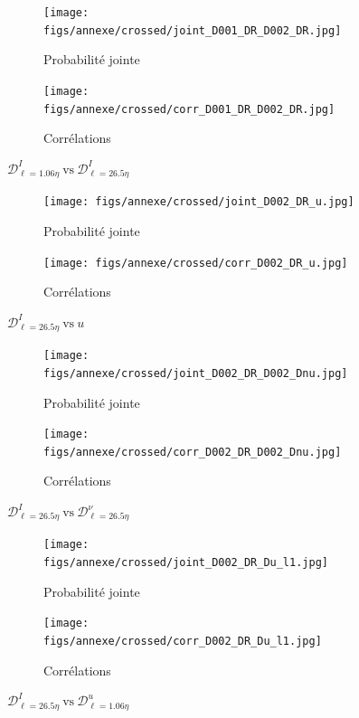 \documentclass[13pt, a4paper]{extarticle}
\begin{document}
\begin{figure}[H]
  \centering
  \begin{subfigure}[b]{0.48\linewidth}
  \centering
  \texttt{[image: figs/annexe/crossed/joint\_D001\_DR\_D002\_DR.jpg]}
  \caption{Probabilité jointe}
  \end{subfigure}
  \begin{subfigure}[b]{0.48\linewidth}
    \centering
    \texttt{[image: figs/annexe/crossed/corr\_D001\_DR\_D002\_DR.jpg]}
    \caption{Corrélations}
    \end{subfigure}
    \caption{$\mathscr{D}^I_{\ell=1.06\eta}~\text{vs}~\mathscr{D}^I_{\ell=26.5\eta}$}
\end{figure}

\begin{figure}[H]
  \centering
  \begin{subfigure}[b]{0.48\linewidth}
  \centering
  \texttt{[image: figs/annexe/crossed/joint\_D002\_DR\_u.jpg]}
  \caption{Probabilité jointe}
  \end{subfigure}
  \begin{subfigure}[b]{0.48\linewidth}
    \centering
    \texttt{[image: figs/annexe/crossed/corr\_D002\_DR\_u.jpg]}
    \caption{Corrélations}
    \end{subfigure}
    \caption{$\mathscr{D}^I_{\ell=26.5\eta}~\text{vs}~u$}
\end{figure}

\begin{figure}[H]
  \centering
  \begin{subfigure}[b]{0.48\linewidth}
  \centering
  \texttt{[image: figs/annexe/crossed/joint\_D002\_DR\_D002\_Dnu.jpg]}
  \caption{Probabilité jointe}
  \end{subfigure}
  \begin{subfigure}[b]{0.48\linewidth}
    \centering
    \texttt{[image: figs/annexe/crossed/corr\_D002\_DR\_D002\_Dnu.jpg]}
    \caption{Corrélations}
    \end{subfigure}
    \caption{$\mathscr{D}^I_{\ell=26.5\eta}~\text{vs}~\mathscr{D}^\nu_{\ell=26.5\eta}$}
\end{figure}

\begin{figure}[H]
  \centering
  \begin{subfigure}[b]{0.48\linewidth}
  \centering
  \texttt{[image: figs/annexe/crossed/joint\_D002\_DR\_Du\_l1.jpg]}
  \caption{Probabilité jointe}
  \end{subfigure}
  \begin{subfigure}[b]{0.48\linewidth}
    \centering
    \texttt{[image: figs/annexe/crossed/corr\_D002\_DR\_Du\_l1.jpg]}
    \caption{Corrélations}
    \end{subfigure}
    \caption{$\mathscr{D}^I_{\ell=26.5\eta}~\text{vs}~\mathscr{D}^u_{\ell=1.06\eta}$}
\end{figure}
\end{document}
